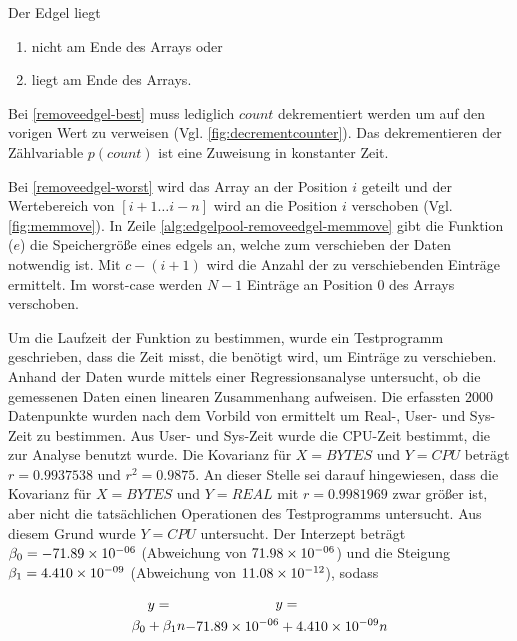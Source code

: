 

Der Edgel liegt
\begin{enumerate}
	\item nicht am Ende des Arrays oder \label{removeedgel-worst}
	\item liegt am Ende des Arrays. \label{removeedgel-best}
\end{enumerate}

Bei \autoref{removeedgel-best} muss lediglich $\mathit{count}$ dekrementiert werden um auf den vorigen Wert zu verweisen
 (Vgl. \autoref{fig:decrementcounter}). Das dekrementieren der Zählvariable $p(\mathit{count})$ ist eine Zuweisung in
 konstanter Zeit. %

Bei \autoref{removeedgel-worst} wird das Array an der Position $i$ geteilt und der Wertebereich von $[i+1 \dotsc i-n]$
 wird an die Position $i$ verschoben (Vgl. \autoref{fig:memmove}). %
In Zeile \ref{alg:edgelpool-removeedgel-memmove} gibt die Funktion ($e$) die Speichergröße eines
 \glspl{edgel} an, welche zum verschieben der Daten notwendig ist. Mit $c - (i + 1)$ wird die Anzahl der zu
 verschiebenden Einträge ermittelt. Im worst-case werden $N-1$ Einträge an Position $0$ des Arrays verschoben.

Um die Laufzeit der Funktion  zu bestimmen, wurde ein Testprogramm geschrieben, dass die Zeit misst,
 die benötigt wird, um Einträge zu verschieben. Anhand der Daten wurde mittels einer Regressionsanalyse untersucht, ob
 die gemessenen Daten einen linearen Zusammenhang aufweisen. Die erfassten $2000$ Datenpunkte wurden nach dem Vorbild von
ermittelt um Real-, User- und Sys-Zeit zu bestimmen. Aus User- und Sys-Zeit wurde die CPU-Zeit bestimmt, die zur
 Analyse benutzt wurde. Die Kovarianz für $X = \mathit{BYTES}$ und $Y = \mathit{CPU}$ beträgt $r = 0.9937538$ und
 $r^2 = 0.9875$. An dieser Stelle sei darauf hingewiesen, dass die Kovarianz für $X = \mathit{BYTES}$ und
 $Y = \mathit{REAL}$ mit $r = 0.9981969$ zwar größer ist, aber nicht die tatsächlichen Operationen des Testprogramms
 untersucht. Aus diesem Grund wurde $Y = \mathit{CPU}$ untersucht. Der Interzept beträgt $\beta_0 = -71.89\times 10^{-06}$
 (Abweichung von $71.98\times 10^{-06}$) und die Steigung $\beta_1 = 4.410\times 10^{-09}$ (Abweichung von $11.08\times 10^{-12}$), sodass

\begin{subequations}
\begin{multline}
	y =\\ \beta_0 + \beta_1n
\end{multline}
\begin{multline}
	y =\\ -71.89\e{-06} + 4.410\e{-09}n
\end{multline}
\end{subequations} %

